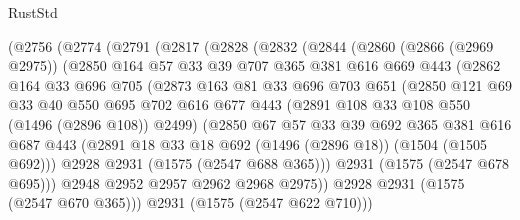 \begin{lexlean}{RustStd}
\begin{coremodule}
{\begin{coremodule}
{{{{{{{{{{        (@2756
          (@2774
            (@2791
              (@2817
                (@2828
                  (@2832
                    (@2844
                      (@2860
                        (@2866 (@2969 @2975))
                        (@2850
                          @164
                          @57
                          @33
                          @39
                          @707
                          @365
                          @381
                          @616
                          @669
                          @443
                          (@2862
                            @164
                            @33
                            @696
                            @705
                            (@2873
                              @163
                              @81
                              @33
                              @696
                              @703
                              @651
                              (@2850
                                @121
                                @69
                                @33
                                @40
                                @550
                                @695
                                @702
                                @616
                                @677
                                @443
                                (@2891 @108 @33 @108 @550 (@1496 (@2896 @108)) @2499)
                                (@2850
                                  @67
                                  @57
                                  @33
                                  @39
                                  @692
                                  @365
                                  @381
                                  @616
                                  @687
                                  @443
                                  (@2891 @18 @33 @18 @692 (@1496 (@2896 @18)) (@1504 (@1505 @692)))
                                  @2928
                                  @2931
                                  (@1575 (@2547 @688 @365)))
                                @2931
                                (@1575 (@2547 @678 @695)))
                              @2948
                              @2952
                              @2957
                              @2962
                              @2968
                              @2975))
                          @2928
                          @2931
                          (@1575 (@2547 @670 @365)))
                        @2931
                        (@1575 (@2547 @622 @710)))
}}}}}}}}}}
\end{coremodule}}
\end{coremodule}
\end{lexlean}
